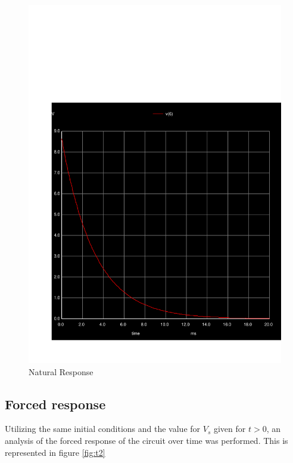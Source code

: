   \begin{figure}[H] \centering
    \includegraphics[width=1\linewidth]{../sim/trans3.pdf}
    \caption{Natural Response}
    \label{fig:p3}
    \end{figure}

  \subsection{Forced response}

 Utilizing the same initial conditions and the value for $V_s$ given for $t>0$,
 an analysis of the forced response of the circuit over time was performed.
This is represented in figure \ref{fig:t2}

